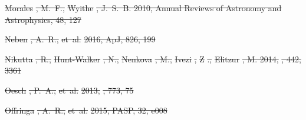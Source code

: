 \documentclass[numberedappendix]{emulateapj}
\providecommand{\DIFdel}[1]{{\protect\color{red}\sout{#1}}}                      %
\begin{document}
\DIFdel{Morales}%
\DIFdel{, M.~F., }%
\DIFdel{Wyithe}%
\DIFdel{, J.~S.~B. 2010, Annual Reviews of Astronomy and
  Astrophysics, 48, 127
}%

\DIFdel{Neben}%
\DIFdel{, A.~R., }%
\DIFdel{et~al.}%
\DIFdel{2016, ApJ, 826, 199
}%

\DIFdel{Nikutta}%
\DIFdel{, R., }%
\DIFdel{Hunt-Walker}%
\DIFdel{, N., }%
\DIFdel{Nenkova}%
\DIFdel{, M., }%
\DIFdel{Ivezi}%
\DIFdel{, }%
\DIFdel{Z}%
\DIFdel{., }%
\DIFdel{Elitzur}%
\DIFdel{, M. 2014, }%
\DIFdel{, 442, 3361
}%

\DIFdel{Oesch}%
\DIFdel{, P.~A., }%
\DIFdel{et~al.}%
\DIFdel{2013, }%
\DIFdel{, 773, 75
}%

\DIFdel{Offringa}%
\DIFdel{, A.~R., }%
\DIFdel{et~al.}%
\DIFdel{2015, PASP, 32, e008
}%
\end{document}
